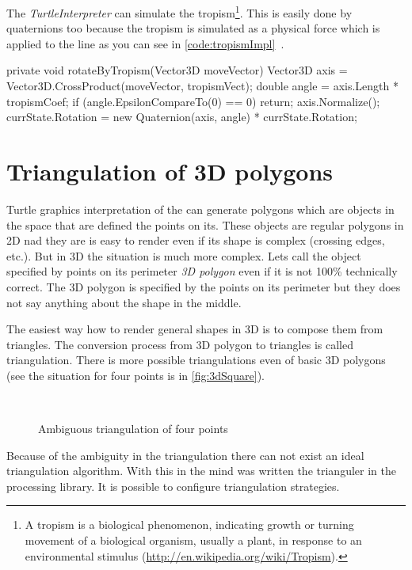 The \emph{TurtleInterpreter} can simulate the tropism\footnote{A tropism is a biological phenomenon, indicating growth or turning movement of a biological organism, usually a plant, in response to an environmental stimulus (\url{http://en.wikipedia.org/wiki/Tropism}).}.
This is easily done by quaternions too because the tropism is simulated as a physical force which is applied to the line as you can see in \autoref{code:tropismImpl}~\cite[p.~58]{PL91}.

\begin{Csharp}[label=code:tropismImpl,caption={Implementation of the tropism which is applied after each line}]
private void rotateByTropism(Vector3D moveVector) {
	Vector3D axis = Vector3D.CrossProduct(moveVector, tropismVect);
	double angle = axis.Length * tropismCoef;
	if (angle.EpsilonCompareTo(0) == 0) {
		return;
	}
	axis.Normalize();
	currState.Rotation = new Quaternion(axis, angle) * currState.Rotation;
}
\end{Csharp}


\section{Triangulation of 3D polygons}

Turtle graphics interpretation of the \lsystems can generate polygons which are objects in the space that are defined the points on its.
These objects are regular polygons in 2D nad they are is easy to render even if its shape is complex (crossing edges, etc.).
But in 3D the situation is much more complex.
Lets call the object specified by points on its perimeter \emph{3D polygon} even if it is not 100\% technically correct.
The 3D polygon is specified by the points on its perimeter but they does not say anything about the shape in the middle.

The easiest way how to render general shapes in 3D is to compose them from triangles.
The conversion process from 3D polygon to triangles is called triangulation.
There is more possible triangulations even of basic 3D polygons (see the situation for four points is in \autoref{fig:3dSquare}).

\begin{figure}[h!]
	\hfill
	\hfill
	\hfill ~
	\caption{Ambiguous triangulation of four points}
	\label{fig:3dSquare}
\end{figure}

Because of the ambiguity in the triangulation there can not exist an ideal triangulation algorithm.
With this in the mind was written the trianguler in the \lsystem processing library.
It is possible to configure triangulation strategies.

